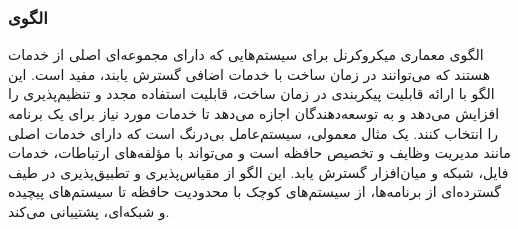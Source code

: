 \subsubsection{الگوی }
\label{archMicrokernelSec}
\begin{RTL}
الگوی معماری میکروکرنل برای سیستم‌هایی که دارای مجموعه‌ای اصلی
از خدمات هستند که می‌توانند در زمان ساخت با خدمات
اضافی گسترش یابند، مفید است.
این الگو با ارائه قابلیت پیکربندی در زمان ساخت،
قابلیت استفاده مجدد و تنظیم‌پذیری را افزایش می‌دهد و به توسعه‌دهندگان اجازه
می‌دهد تا خدمات مورد نیاز برای یک برنامه را انتخاب
کنند. یک مثال معمولی، سیستم‌عامل بی‌درنگ
است که دارای خدمات اصلی مانند مدیریت وظایف
و تخصیص حافظه است و می‌تواند با مؤلفه‌های ارتباطات،
خدمات فایل، شبکه و میان‌افزار گسترش یابد.
این الگو از مقیاس‌پذیری و تطبیق‌پذیری در
طیف گسترده‌ای از برنامه‌ها، از سیستم‌های کوچک با محدودیت
حافظه تا سیستم‌های پیچیده و شبکه‌ای، پشتیبانی می‌کند.
\end{RTL}